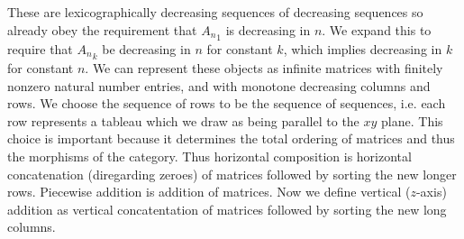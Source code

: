 \documentclass{tac}
\begin{document}
{\begin{enumerate}
These are lexicographically decreasing sequences of decreasing sequences so already obey the requirement that
${A_n}_1$ is decreasing in $n$. We expand this to require that ${A_n}_k$ be decreasing in $n$ for constant $k$,
which implies decreasing in $k$ for constant $n.$ We can represent these objects as infinite matrices with finitely nonzero
natural number entries, and with monotone decreasing columns and rows. We choose the sequence of rows to be the sequence
of sequences, i.e. each row represents a tableau which we draw as being parallel to the $xy$ plane. 
This choice is important because it determines the total ordering of matrices and thus the morphisms of the category.
Thus
horizontal composition is horizontal concatenation (diregarding zeroes) of matrices followed by sorting the new longer rows. Piecewise 
addition is addition of matrices. Now we define vertical ($z$-axis) addition as vertical concatentation of matrices followed
by sorting the new long columns. 



\end{enumerate}}
\end{document}
